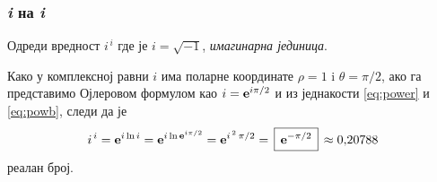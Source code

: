 \subsubsection{\textit{i} на \textit{i}}

\zadatak Одреди вредност $i^{\,i}$ где је $i=\sqrt{-1}$, {\sl имагинарна јединица}.

\resenje
Како у комплексној равни $i$ има поларне координате $\rho=1$ i $\theta=\pi/2$, 
ако га представимо Ојлеровом формулом као
$i={\bf e}^{i\pi/2}$ и из једнакости \eqref{eq:power} и \eqref{eq:powb}, следи да је
$$
i^{\,i}=\e^{i\ln i} = \e^{i\ln \e^{i\pi/2}}=\e^{i^{\,2}\,\pi/2}=\ram{\e^{-\pi/2}}\approx0\.20788 
$$
реалан број.
